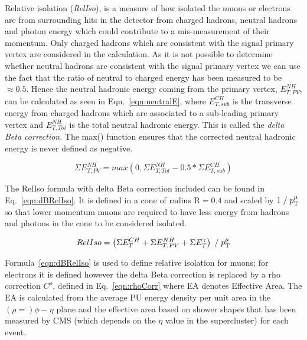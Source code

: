 Relative isolation (\emph{RelIso}), is a measure of how isolated the muons or electrons are from surrounding hits in the detector from charged hadrons, neutral hadrons and photon energy which could contribute to a mis-measurement of their momentum. Only charged hadrons which are consistent with the signal primary vertex are considered in the calculation. As it is not possible to determine whether neutral hadrons are consistent with the signal primary vertex we can use the fact that the ratio of neutral to charged energy has been measured to be $\approx 0.5$. Hence the neutral hadronic energy coming from the primary vertex, $E_{T,PV}^{NH}$, can be calculated as seen in Eqn.~\ref{eqn:neutralE}, where $E_{T,sub}^{CH}$ is the transverse energy from charged hadrons which are associated to a sub-leading primary vertex and $E_{T,Tot}^{NH}$ is the total neutral hadronic energy. This is called the \emph{delta Beta correction}. The max() function ensures that the corrected neutral hadronic energy is never defined as negative.


\begin{centering}
\begin{equation}
\Sigma E_{T,PV}^{NH}  =  max(0, \Sigma E_{T,Tot}^{NH} - 0.5*\Sigma E_{T,sub}^{CH})
\label{eqn:neutralE}
\end{equation}
\end{centering}



The RelIso formula with delta Beta correction included can be found in Eq.~\ref{eqn:dBRelIso}. It is defined in a cone of radius $\textrm{R}=0.4$ and scaled by $1\; / \;p_{\mathrm{T}}^{\mu}$ so that lower momentum muons are required to have less energy from hadrons and photons in the cone to be considered isolated.

\begin{centering}
\begin{equation}
RelIso = \left( \Sigma E_{T}^{CH} + \Sigma E_{T,PV}^{NH} +  \Sigma E_{T}^{\gamma} \right) \; / \;   p_{\mathrm{T}}^{\mu}
\label{eqn:dBRelIso}
\end{equation}
\end{centering}


Formula~\ref{eqn:dBRelIso} is used to define relative isolation for muons; for electrons it is defined however the delta Beta correction is replaced by a rho correction $C^{\rho}$, defined in Eq.~\ref{eqn:rhoCorr} where EA denotes Effective Area. The EA is calculated from the average PU energy density per unit area in the $(\rho=)\phi-\eta$ plane and the effective area based on shower shapes that has been measured by CMS (which depends on the $\eta$ value in the supercluster) for each event.

